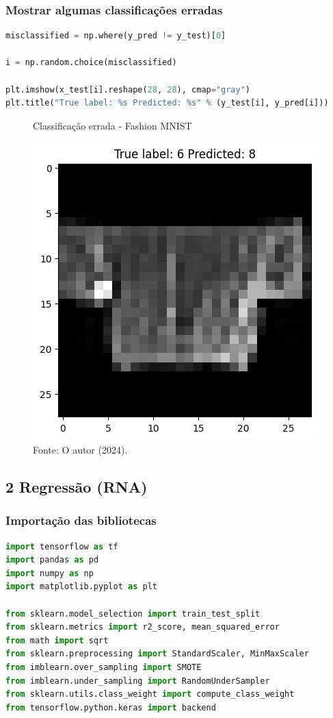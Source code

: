 \subsubsection*{Mostrar algumas classificações erradas}
\begin{lstlisting}[language=Python, style=input]
misclassified = np.where(y_pred != y_test)[0]

i = np.random.choice(misclassified)

plt.imshow(x_test[i].reshape(28, 28), cmap="gray")
plt.title("True label: %s Predicted: %s" % (y_test[i], y_pred[i]))
\end{lstlisting}
\begin{figure}[H]
\centering
\caption{Classificação errada - Fashion MNIST}
\includegraphics[width=.6\linewidth]{apendices/fig/13_IAA012_4.png}
\caption*{Fonte: O autor (2024).}
\end{figure}

\subsection*{\textbf{2 Regressão (RNA)}}
\subsubsection*{Importação das bibliotecas}
\begin{lstlisting}[language=Python, style=input]
import tensorflow as tf
import pandas as pd
import numpy as np
import matplotlib.pyplot as plt

from sklearn.model_selection import train_test_split
from sklearn.metrics import r2_score, mean_squared_error
from math import sqrt
from sklearn.preprocessing import StandardScaler, MinMaxScaler
from imblearn.over_sampling import SMOTE
from imblearn.under_sampling import RandomUnderSampler
from sklearn.utils.class_weight import compute_class_weight
from tensorflow.python.keras import backend
\end{lstlisting}
